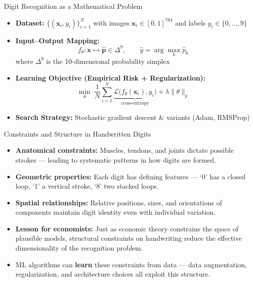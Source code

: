 \documentclass[10pt,english,aspectratio=169]{beamer}
\begin{document}
\begin{frame}{Digit Recognition as a Mathematical Problem}
\begin{itemize}
  \item \textbf{Dataset:}
        $\bigl\{(\mathbf{x}_i, y_i)\bigr\}_{i=1}^N$ with images $\mathbf{x}_i \in [0,1]^{784}$
        and labels $y_i \in \{0,\dots,9\}$

  \item \textbf{Input--Output Mapping:}
        \[
          f_{\theta} \colon \mathbf{x} \longmapsto \hat{\mathbf{p}} \in \Delta^{9},
          \qquad
          \hat{y} = \arg\max_{k} \hat{p}_k
        \]
        where $\Delta^{9}$ is the 10-dimensional probability simplex

  \item \textbf{Learning Objective (Empirical Risk + Regularization):}
        \[
          \min_{\theta} \;
          \frac{1}{N}\sum_{i=1}^{N}
          \underbrace{\mathcal{L}\bigl(f_{\theta}(\mathbf{x}_i), y_i\bigr)}_{\text{cross-entropy}}
          + \lambda \lVert\theta\rVert_{p}
        \]

  \item \textbf{Search Strategy:} Stochastic gradient descent \& variants (Adam, RMSProp)
\end{itemize}
\end{frame}

\begin{frame}{Constraints and Structure in Handwritten Digits}
\begin{itemize}
\item \textbf{Anatomical constraints:} Muscles, tendons, and joints dictate possible strokes --- leading to systematic patterns in how digits are formed.

\medskip
\item \textbf{Geometric properties:} Each digit has defining features --- `0' has a closed loop, `1' a vertical stroke, `8' two stacked loops.

\medskip
\item \textbf{Spatial relationships:} Relative positions, sizes, and orientations of components maintain digit identity even with individual variation.

\medskip
\item \textbf{Lesson for economists:} Just as economic theory constrains the space of plausible models, structural constraints on handwriting reduce the effective dimensionality of the recognition problem.

\medskip
\item ML algorithms can \textbf{learn} these constraints from data --- data augmentation, regularization, and architecture choices all exploit this structure.
\end{itemize}
\end{frame}
\end{document}
